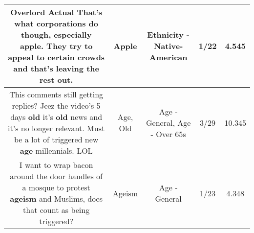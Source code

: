 \documentclass[11pt]{article}
\newlength\mylength
\begin{document}
\begin{center}
\begin{longtable}{|C{.65\mylength}|C{.30\mylength}|C{.12\mylength}|C{.12\mylength}|C{.12\mylength}|}
  \small Overlord Actual That's what corporations do though, especially \textbf{apple}. They try to appeal to certain crowds and that's leaving the rest out.\normalsize   & Apple & Ethnicity - Native-American & 1/22 & 4.545 \\  \hline
  \small This comments still getting replies? Jeez the video's 5 days \textbf{old} it's \textbf{old} news and it's no longer relevant. Must be a lot of triggered new \textbf{age} millennials. LOL\normalsize   & Age, Old & Age - General, Age - Over 65s & 3/29 & 10.345 \\  \hline
  \small I want to wrap bacon around the door handles of a mosque to protest \textbf{ageism} and Muslims, does that count as being triggered?\normalsize   & Ageism & Age - General & 1/23 & 4.348 \\  \hline
  
\end{longtable}
\end{center}
\end{document}
